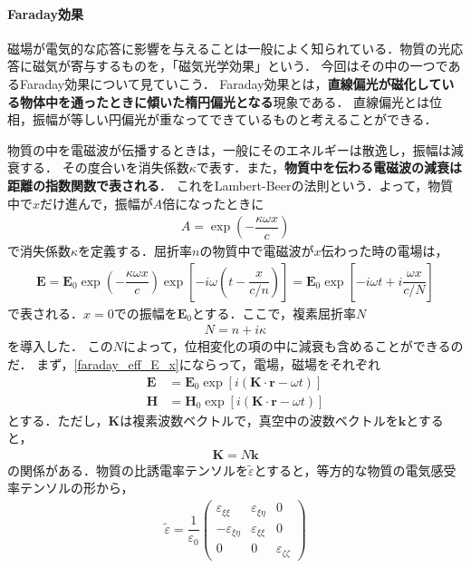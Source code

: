 \paragraph{Faraday効果}
磁場が電気的な応答に影響を与えることは一般によく知られている．物質の光応答に磁気が寄与するものを，「磁気光学効果」という．
今回はその中の一つであるFaraday効果について見ていこう．
Faraday効果とは，\textbf{直線偏光が磁化している物体中を通ったときに傾いた楕円偏光となる}現象である．
直線偏光とは位相，振幅が等しい円偏光が重なってできているものと考えることができる．

物質の中を電磁波が伝播するときは，一般にそのエネルギーは散逸し，振幅は減衰する．
その度合いを消失係数$\kappa$で表す．また，\textbf{物質中を伝わる電磁波の減衰は距離の指数関数で表される}．
これをLambert-Beerの法則という．よって，物質中で$x$だけ進んで，振幅が$A$倍になったときに
\begin{align}
  A=\exp\left( - \dfrac{\kappa\omega{x}}{c}\right)
\end{align}
で消失係数$\kappa$を定義する．屈折率$n$の物質中で電磁波が$x$伝わった時の電場は，
\begin{align}
  \boldsymbol{E}=\boldsymbol{E}_0\exp\left( - \dfrac{\kappa\omega{x}}{c}\right)\exp\left[ - i\omega\left(t - \dfrac{x}{c/n}\right)\right] = \boldsymbol{E}_0\exp\left[ - i\omega{t}+i\dfrac{\omega{x}}{c/N}\right]
  \label{faraday_eff_E_x}
\end{align}
で表される．$x=0$での振幅を$\boldsymbol{E}_0$とする．ここで，複素屈折率$N$
\begin{align}
  N=n+i\kappa
\end{align}
を導入した．
この$N$によって，位相変化の項の中に減衰も含めることができるのだ．
まず，\eqref{faraday_eff_E_x}にならって，電場，磁場をそれぞれ
\begin{align}
  \boldsymbol{E} &= \boldsymbol{E}_0\exp\left[i(\boldsymbol{K}\cdot\boldsymbol{r} - \omega{t})\right]\label{faraday_eff_Edef}\\
  \boldsymbol{H} &= \boldsymbol{H}_0\exp\left[i(\boldsymbol{K}\cdot\boldsymbol{r} - \omega{t})\right]\label{faraday_eff_Hdef}
\end{align}
とする．ただし，$\boldsymbol{K}$は複素波数ベクトルで，真空中の波数ベクトルを$\boldsymbol{k}$とすると，
\begin{align}
  \boldsymbol{K}=N\boldsymbol{k}\label{faraday_eff_K}
\end{align}
の関係がある．物質の比誘電率テンソルを$\tilde{\varepsilon}$とすると，等方的な物質の電気感受率テンソルの形から，
\begin{align}
  \tilde{\varepsilon}=
  \dfrac{1}{\varepsilon_0}
  \left(
  \begin{array}{ccc}
    \varepsilon_{\xi\xi} & \varepsilon_{\xi\eta} & 0 \\
    - \varepsilon_{\xi\eta} & \varepsilon_{\xi\xi} & 0 \\
    0 & 0 & \varepsilon_{\zeta\zeta}
  \end{array}
  \right)
  \label{faraday_eff_tensor}
\end{align}
